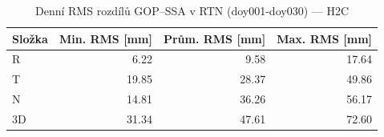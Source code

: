 \begin{table}[H]
\centering
\caption{Denní RMS rozdílů GOP–SSA v RTN (doy001-doy030) — H2C}
\label{tab:hc_ZAZG_doy001-doy030_rms}
\begin{tabular}{lrrr}
\toprule
Složka & Min. RMS [mm] & Prům. RMS [mm] & Max. RMS [mm] \\
\midrule
R & 6.22 & 9.58 & 17.64 \\
T & 19.85 & 28.37 & 49.86 \\
N & 14.81 & 36.26 & 56.17 \\
3D & 31.34 & 47.61 & 72.60 \\
\bottomrule
\end{tabular}
\end{table}
